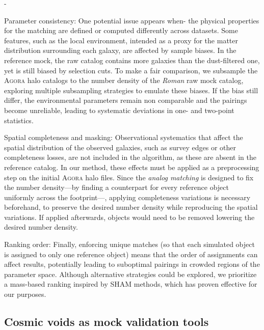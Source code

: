 \documentclass[]{aa} %
\begin{document}
\begin{list}{-}{}
\item [\textbullet] {Parameter consistency: } One potential issue appears when- the physical properties for the matching are defined or computed differently across datasets. Some features, such as the local environment, intended as a proxy for the matter distribution surrounding each galaxy, are affected by sample biases. In the reference mock, the raw catalog contains more galaxies than the dust-filtered one, yet is still biased by selection cuts. To make a fair comparison, we subsample the \textsc{Agora} halo catalogs to the number density of the \emph{Roman} raw mock catalog, exploring multiple subsampling strategies to emulate these biases. If the bias still differ, the environmental parameters remain non comparable and the pairings become unreliable, leading to systematic deviations in one- and two-point statistics.
\bigskip
\item [\textbullet] {Spatial completeness and masking: } Observational systematics that affect the spatial distribution of the observed galaxies, such as survey edges or other completeness losses, are not included in the algorithm, as these are absent in the reference catalog. In our method, these effects must be applied as a preprocessing step on the initial \textsc{Agora} halo files. Since the \emph{analog matching} is designed to fix the number density---by finding a counterpart for every reference object uniformly across the footprint---, applying completeness variations is necessary beforehand, to preserve the desired number density while reproducing the spatial variations. If applied afterwards, objects would need to be removed lowering the desired number density.
\bigskip
\item [\textbullet] {Ranking order: } Finally, enforcing unique matches (so that each simulated object is assigned to only one reference object) means that the order of assignments can affect results, potentially leading to suboptimal pairings in crowded regions of the parameter space. Although alternative strategies could be explored, we prioritize a mass-based ranking inspired by SHAM methods, which has proven effective for our purposes.
\end{list}

\subsection{Cosmic voids as mock validation tools}
\end{document}
